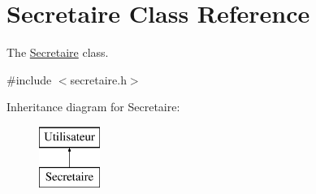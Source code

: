 \hypertarget{class_secretaire}{}\section{Secretaire Class Reference}
\label{class_secretaire}


The \mbox{\hyperlink{class_secretaire}{Secretaire}} class.  




{\ttfamily \#include $<$secretaire.\+h$>$}

Inheritance diagram for Secretaire\+:\begin{figure}[H]
\begin{center}
\leavevmode
\includegraphics[height=2.000000cm]{class_secretaire}
\end{center}
\end{figure}
